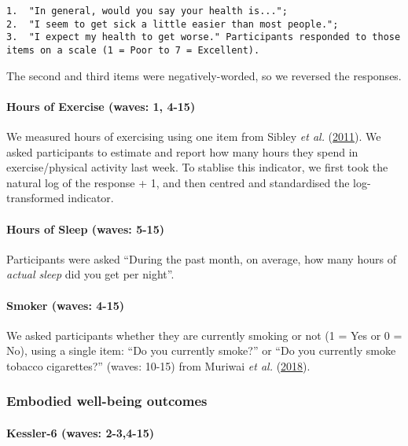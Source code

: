 \documentclass[
  singlecolumn,
  9pt]{article}
\let\oldparagraph\paragraph
\renewcommand{\paragraph}[1]{\oldparagraph{#1}\mbox{}}
\begin{document}
\begin{verbatim}
1.  "In general, would you say your health is...";
2.  "I seem to get sick a little easier than most people.";
3.  "I expect my health to get worse." Participants responded to those items on a scale (1 = Poor to 7 = Excellent).
\end{verbatim}

The second and third items were negatively-worded, so we reversed the
responses.

\paragraph{Hours of Exercise (waves: 1,
4-15)}\label{hours-of-exercise-waves-1-4-15}

We measured hours of exercising using one item from Sibley \emph{et al.}
(\hyperref[ref-sibley2011]{2011}). We asked participants to estimate and
report how many hours they spend in exercise/physical activity last
week. To stablise this indicator, we first took the natural log of the
response + 1, and then centred and standardised the log-transformed
indicator.

\paragraph{Hours of Sleep (waves:
5-15)}\label{hours-of-sleep-waves-5-15}

Participants were asked ``During the past month, on average, how many
hours of \emph{actual sleep} did you get per night''.

\paragraph{Smoker (waves: 4-15)}\label{smoker-waves-4-15}

We asked participants whether they are currently smoking or not (1 = Yes
or 0 = No), using a single item: ``Do you currently smoke?'' or ``Do you
currently smoke tobacco cigarettes?'' (waves: 10-15) from Muriwai
\emph{et al.} (\hyperref[ref-muriwai_looking_2018]{2018}).

\subsubsection{Embodied well-being
outcomes}\label{embodied-well-being-outcomes}

\paragraph{Kessler-6 (waves: 2-3,4-15)}\label{kessler-6-waves-2-34-15}
\end{document}

